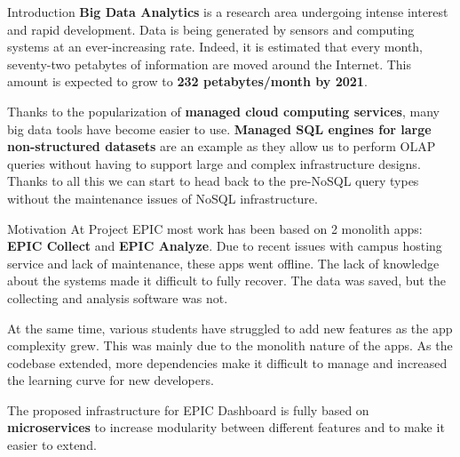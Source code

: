 \documentclass[final]{beamer}
\newlength{\onecolwid}
\begin{document}
\begin{darkframes}
\begin{frame}
\begin{columns}[t]
\begin{column}{\onecolwid}


\begin{exampleblock}{Introduction}
\textbf{Big Data Analytics} is a research area undergoing intense interest and rapid development. Data is being generated by sensors and computing systems at an ever-increasing rate. Indeed, it is estimated that every month, seventy-two petabytes of
information are moved around the Internet. This amount is expected to grow
to \textbf{232 petabytes/month by 2021}. 

Thanks to the popularization of \textbf{managed cloud computing services}, many big data tools have become easier to use. \textbf{Managed SQL engines for large non-structured datasets} are an example as they allow us to perform OLAP queries without having to support large and complex infrastructure designs. Thanks to all this we can start to head back to the pre-NoSQL query types without the maintenance issues of NoSQL infrastructure.
\end{exampleblock}
\begin{exampleblock}{Motivation}
At Project EPIC most work has been based on 2 monolith apps: \textbf{EPIC Collect}\cite{schram2012mysql} and \textbf{EPIC Analyze}\cite{anderson2015design}. Due to recent issues with campus hosting service and lack of maintenance, these apps went offline. The lack of knowledge about the systems made it difficult to fully recover. The data was saved, but the collecting and analysis software was not.

At the same time, various students have struggled to add new features as the app complexity grew. This was mainly due to the monolith nature of the apps. As the codebase extended, more dependencies make it difficult to manage and increased the learning curve for new developers.

The proposed infrastructure for EPIC Dashboard is fully based on \textbf{microservices} to increase modularity between different features and to make it easier to extend. 
\end{exampleblock}





\end{column}
\end{columns}
\end{frame}
\end{darkframes}
\end{document}
